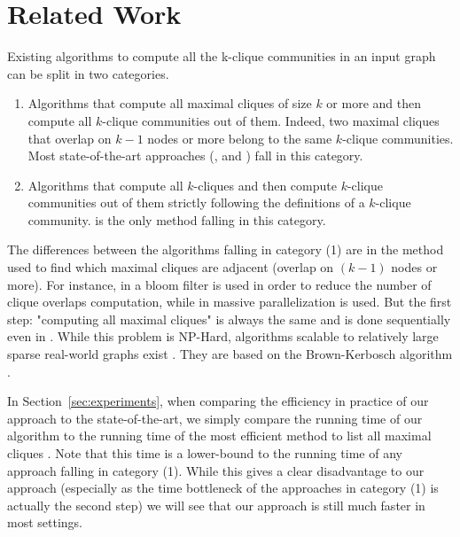\section{Related Work}
\label{sec:related}


Existing algorithms to compute all the k-clique communities in an input graph can be split in two categories.
\begin{enumerate}
\item Algorithms that compute all maximal cliques of size $k$ or more and then compute all $k$-clique communities out of them. Indeed, two maximal cliques that overlap on $k-1$ nodes or more belong to the same $k$-clique communities. Most state-of-the-art approaches (\cite{palla2005uncovering}, \cite{reid2012percolation} and \cite{gregori2013parallel}) fall in this category.
\item Algorithms that compute all $k$-cliques and then compute $k$-clique communities out of them strictly following the definitions of a $k$-clique community. \cite{kumpula2008sequential} is the only method falling in this category.
\end{enumerate}

The differences between the algorithms falling in category (1) are in the method used to find which maximal cliques are adjacent (overlap on $(k-1)$ nodes or more). For instance, in \cite{reid2012percolation} a bloom filter is used in order to reduce the number of clique overlaps computation, while in \cite{gregori2013parallel} massive parallelization is used. But the first step: "computing all maximal cliques" is always the same and is done sequentially even in \cite{gregori2013parallel}.
While this problem is NP-Hard, algorithms scalable to relatively large sparse real-world graphs exist \cite{eppstein2010listing,eppstein2011listing}. They are based on the Brown-Kerbosch algorithm \cite{bron1973algorithm}.

In Section~\ref{sec:experiments}, when comparing the efficiency in practice of our approach to the state-of-the-art, we simply compare the running time of our algorithm to the running time of the most efficient method to list all maximal cliques \cite{eppstein2011listing}. Note that this time is a lower-bound to the running time of any approach falling in category (1). While this gives a clear disadvantage to our approach (especially as the time bottleneck of the approaches in category (1) is actually the second step) we will see that our approach is still much faster in most settings.

